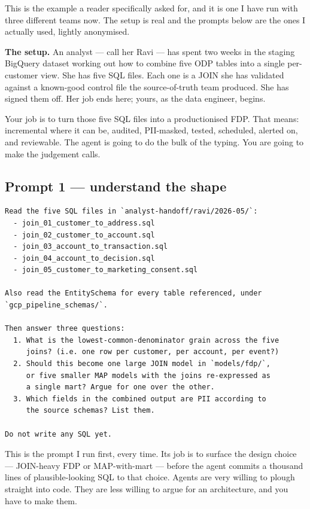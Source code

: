 \documentclass[
  11pt,
  british,
  oneside]{book}
\begin{document}
This is the example a reader specifically asked for, and it is one I
have run with three different teams now. The setup is real and the
prompts below are the ones I actually used, lightly anonymised.

\textbf{The setup.} An analyst --- call her Ravi --- has spent two weeks
in the staging BigQuery dataset working out how to combine five ODP
tables into a single per-customer view. She has five SQL files. Each one
is a JOIN she has validated against a known-good control file the
source-of-truth team produced. She has signed them off. Her job ends
here; yours, as the data engineer, begins.

Your job is to turn those five SQL files into a productionised FDP. That
means: incremental where it can be, audited, PII-masked, tested,
scheduled, alerted on, and reviewable. The agent is going to do the bulk
of the typing. You are going to make the judgement calls.

\hypertarget{prompt-1-understand-the-shape}{%
\subsection{Prompt 1 --- understand the
shape}\label{prompt-1-understand-the-shape}}

\begin{verbatim}
Read the five SQL files in `analyst-handoff/ravi/2026-05/`:
  - join_01_customer_to_address.sql
  - join_02_customer_to_account.sql
  - join_03_account_to_transaction.sql
  - join_04_account_to_decision.sql
  - join_05_customer_to_marketing_consent.sql

Also read the EntitySchema for every table referenced, under
`gcp_pipeline_schemas/`.

Then answer three questions:
  1. What is the lowest-common-denominator grain across the five
     joins? (i.e. one row per customer, per account, per event?)
  2. Should this become one large JOIN model in `models/fdp/`,
     or five smaller MAP models with the joins re-expressed as
     a single mart? Argue for one over the other.
  3. Which fields in the combined output are PII according to
     the source schemas? List them.

Do not write any SQL yet.
\end{verbatim}

This is the prompt I run first, every time. Its job is to surface the
design choice --- JOIN-heavy FDP or MAP-with-mart --- before the agent
commits a thousand lines of plausible-looking SQL to that choice. Agents
are very willing to plough straight into code. They are less willing to
argue for an architecture, and you have to make them.
\end{document}
